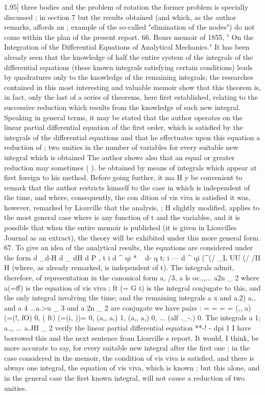 \documentclass[11pt,a4paper]{book}
\begin{document}
1.95]
three bodies and the problem of rotation the former problem is specially discussed
;
in section 7 but the results obtained (and which, as the author remarks, affords an
;
example of the so-called "elimination of the nodes") do not come within the plan of
the present report.
66. Bours memoir of 1855, " On the Integration of the Differential Equations of
Analytical Mechanics." It has been already seen that the knowledge of half the entire
system of the integrals of the differential equations (these known integrals satisfying
certain conditions) leads by quadratures only to the knowledge of the remaining
integrals; the researches contained in this most interesting and valuable memoir show
that this theorem is, in fact, only the last of a series of theorems, here first established,
relating to the successive reduction which results from the knowledge of each new
integral. Speaking in general terms, it may be stated that the author operates on the
linear partial differential equation of the first order, which is satisfied by the integrals
of the differential equations and that he effectuates upon this equation a reduction of
;
two unities in the number of variables for every suitable new integral which is
obtained The author shows also that an equal or greater reduction may sometimes
( ).
be obtained by means of integrals which appear at first foreign to his method. Before
going further, it ma H y be convenient to remark that the author restricts himself to
the case in which is independent of the time, and where, consequently, the con
dition of vis viva is satisfied it was, however, remarked by Liouville that the analysis,
; H
slightly modified, applies to the most general case where is any function of t and
the variables, and it is possible that when the entire memoir is published (it is given
in Liouvilles Journal as an extract), the theory will be exhibited under this more
general form.
67. To give an idea of the analytical results, the equations are considered under
the form
d _d-H d _ dH
d P , t i d ^ qi * ~ d- q t; i --- d ^ qi (^(/ _L UU (/ /II
H
(where, as already remarked, is independent of t). The integrals admit, therefore,
of representation in the canonical form a, /3, a ls oc.,,... a2n _ 2 where a(=ff) is the equation
of vis viva ; ft (= G t) is the integral conjugate to this, and the only integral involving
the time; and the remaining integrals a x and a.2) a., and a 4 ...a.>u _ 3 and a 2n _ 2 are conjugate
we have
pairs :
= = = =
(,, a) (=(!, fO) 0, ( ft) (=(i, ))= 0, (a,, a,) 1, (a,, a,) 0, ... (alf ._-.) 0.
The integrals a 1; a.,, ... a.JH _ 2 verify the linear partial differential equation
**-! -
\dqi dpi
1 I have borrowed this and the next sentence from Liouville s report. It would, I think, be more
accurate to say, for every suitable new integral after the first one ; in the case considered in the memoir,
the condition of vis viva is satisfied, and there is always one integral, the equation of vis viva, which is
known ; but this alone, and in the general case the first known integral, will not cause a reduction of two
unities.
\end{document}
